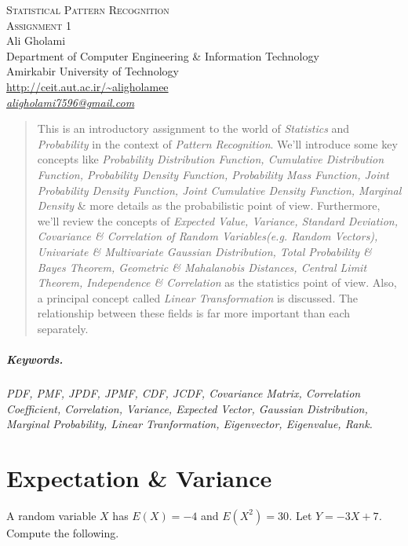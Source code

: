 \documentclass[12pt]{article}
\numberwithin{equation}{section}
\numberwithin{table}{section}
\numberwithin{figure}{section}
\begin{document}

\begin{center}
\textsc{\Large Statistical Pattern Recognition} \\[2pt]
	\textsc{\large Assignment 1}\\
	\vspace{0.5cm}
  Ali Gholami \\[6pt]
  Department of Computer Engineering \& Information Technology\\
  Amirkabir University of Technology  \\[6pt]
  \def\UrlFont{\em}
  \url{http://ceit.aut.ac.ir/~aligholamee}\\
    \href{mailto:aligholami7596@gmail.com}{\textit{aligholami7596@gmail.com}}
\end{center}

\begin{abstract}
This is an introductory assignment to the world of \textit{Statistics} and \textit{Probability} in the context of \textit{Pattern Recognition}. We'll introduce some key concepts like \textit{Probability Distribution Function, Cumulative Distribution Function, Probability Density Function, Probability Mass Function, Joint Probability Density Function, Joint Cumulative Density Function, Marginal Density} \& more details as the probabilistic point of view. Furthermore, we'll review the concepts of \textit{Expected Value, Variance, Standard Deviation, Covariance \& Correlation of Random Variables(e.g. Random Vectors), Univariate \& Multivariate Gaussian Distribution, Total Probability \& Bayes Theorem, Geometric \& Mahalanobis Distances, Central Limit Theorem, Independence \& Correlation} as the statistics point of view. Also, a principal concept called \textit{Linear Transformation} is discussed. The relationship between these fields is far more important than each separately.
\end{abstract}

\subparagraph{Keywords.} \textit{PDF, PMF, JPDF, JPMF, CDF, JCDF, Covariance Matrix, Correlation Coefficient, Correlation, Variance, Expected Vector, Gaussian Distribution, Marginal Probability, Linear Tranformation, Eigenvector, Eigenvalue, Rank.}

\section{Expectation \& Variance}

A random variable \textit{$X$} has \textit{$E(X) = -4$} and \textit{$E(X^2) = 30$.} Let \textit{$Y = -3X + 7$.} Compute the following.
\end{document}
